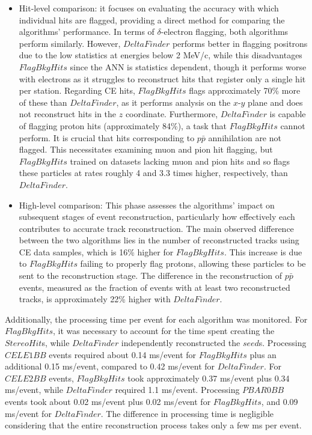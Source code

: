\begin{itemize}
    \item Hit-level comparison: it focuses on evaluating the 
    accuracy with which individual hits are flagged, providing a 
    direct method for comparing the algorithms' performance. In terms 
    of $\delta$-electron flagging, both algorithms perform similarly. 
    However, $DeltaFinder$ performs better in flagging positrons 
    due to the low statistics at energies below 2 MeV/c, 
    while this disadvantages $FlagBkgHits$ since the ANN is 
    statistics dependent, though it 
    performs worse with electrons as it struggles to reconstruct hits 
    that register only a single hit per station. Regarding CE hits, 
    $FlagBkgHits$ flags approximately 70\% more of these than 
    $DeltaFinder$, as it performs analysis on the $x$-$y$ plane and does 
    not reconstruct hits in the $z$ coordinate. Furthermore, 
    $DeltaFinder$ is capable of flagging proton hits (approximately 84\%), 
    a task that $FlagBkgHits$ cannot perform. It is crucial that hits 
    corresponding to $p\bar{p}$ annihilation are not flagged. This necessitates 
    examining muon and pion hit flagging, but $FlagBkgHits$ trained 
    on datasets lacking muon and pion hits and so 
    flags these particles at rates roughly 4 and 3.3 times higher, 
    respectively, than $DeltaFinder$.
    
    \item High-level comparison: This phase assesses the algorithms' 
    impact on subsequent stages of event reconstruction, particularly 
    how effectively each contributes to accurate track reconstruction. 
    The main observed difference between the two algorithms lies in the number 
    of reconstructed tracks using CE data samples, which is 16\% higher 
    for $FlagBkgHits$. This increase is due to $FlagBkgHits$ failing to 
    properly flag protons, allowing these particles to be sent to the 
    reconstruction stage. The difference in the reconstruction of 
    $p\bar{p}$ events, measured as the fraction of events with 
    at least two reconstructed tracks, is approximately 22\% higher with $DeltaFinder$.
\end{itemize}

Additionally, the processing time per event for each algorithm was 
monitored. For $FlagBkgHits$, it was necessary to account for the time 
spent creating the $StereoHit$s, while $DeltaFinder$ independently 
reconstructed the $seed$s. Processing $CELE1BB$ events required about 
0.14 ms/event for $FlagBkgHits$ plus an additional 0.15 ms/event, 
compared to 0.42 ms/event for $DeltaFinder$. For $CELE2BB$ events, 
$FlagBkgHits$ took approximately 0.37 ms/event plus 0.34 ms/event, 
while $DeltaFinder$ required 1.1 ms/event. Processing $PBAR0BB$ 
events took about 0.02 ms/event plus 0.02 ms/event for $FlagBkgHits$, 
and 0.09 ms/event for $DeltaFinder$. The difference in processing time 
is negligible considering that the entire reconstruction process 
takes only a few ms per event.

